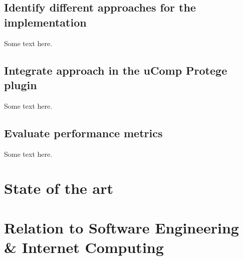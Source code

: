 \documentclass[12pt, notitlepage]{article}
\begin{document}
\subsection{Identify different approaches for the implementation}
Some text here.
\subsection{Integrate approach in the uComp Protege plugin}
Some text here.
\subsection{Evaluate performance metrics}
Some text here.

\section{State of the art}
\section{Relation to Software Engineering \& Internet Computing}



\newpage


\end{document}
